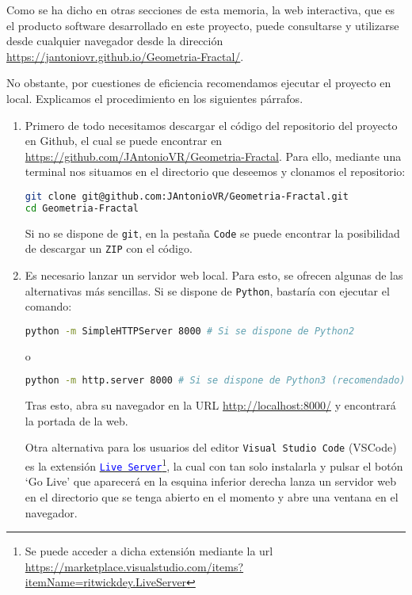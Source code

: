 Como se ha dicho en otras secciones de esta memoria, la web interactiva, que es el producto software desarrollado en este proyecto, puede consultarse y utilizarse desde cualquier navegador desde la dirección \url{https://jantoniovr.github.io/Geometria-Fractal/}.

No obstante, por cuestiones de eficiencia recomendamos ejecutar el
proyecto en local. Explicamos el procedimiento en los siguientes
párrafos.

\begin{enumerate}
\def\labelenumi{\arabic{enumi}.}
\item
  Primero de todo necesitamos descargar el código del repositorio del proyecto en Github, el cual se puede encontrar en \url{https://github.com/JAntonioVR/Geometria-Fractal}. Para ello, mediante una terminal nos situamos en el directorio que deseemos y clonamos el repositorio:

  \begin{lstlisting}[language=bash]
git clone git@github.com:JAntonioVR/Geometria-Fractal.git
cd Geometria-Fractal
  \end{lstlisting}

  Si no se dispone de \texttt{git}, en la pestaña \texttt{Code} se puede encontrar la posibilidad de descargar un \texttt{ZIP} con el código.

\item
  Es necesario lanzar un servidor web local. Para esto, se ofrecen algunas de las alternativas más sencillas. Si se dispone de
  \texttt{Python}, bastaría con ejecutar el comando:

  \begin{lstlisting}[language=bash]
python -m SimpleHTTPServer 8000 # Si se dispone de Python2
  \end{lstlisting}

  o

  \begin{lstlisting}[language=bash]
python -m http.server 8000 # Si se dispone de Python3 (recomendado)
  \end{lstlisting}
  
  Tras esto, abra su navegador en la URL \url{http://localhost:8000/} y encontrará la portada de la web.

  Otra alternativa para los usuarios del editor \texttt{Visual\ Studio\ Code} (VSCode) es la extensión \href{https://marketplace.visualstudio.com/items?itemName=ritwickdey.LiveServer}{\textcolor{blue}{\texttt{Live\ Server}}}\footnote{Se puede acceder a dicha extensión mediante la url \url{https://marketplace.visualstudio.com/items?itemName=ritwickdey.LiveServer}}, la cual con tan solo instalarla y pulsar el botón `Go Live' que aparecerá en la esquina inferior derecha lanza un servidor web en el directorio que se tenga abierto en el momento y abre una ventana en el navegador.


\end{enumerate}

